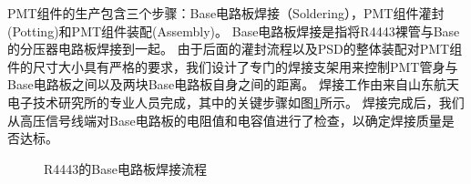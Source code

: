 PMT组件的生产包含三个步骤：Base电路板焊接（Soldering），PMT组件灌封(Potting)和PMT组件装配(Assembly)。
Base电路板焊接是指将R4443裸管与Base的分压器电路板焊接到一起。
由于后面的灌封流程以及PSD的整体装配对PMT组件的尺寸大小具有严格的要求，我们设计了专门的焊接支架用来控制PMT管身与Base电路板之间以及两块Base电路板自身之间的距离。
焊接工作由来自山东航天电子技术研究所的专业人员完成，其中的关键步骤如图\ref{fig:construction:soldering}所示。
焊接完成后，我们从高压信号线端对Base电路板的电阻值和电容值进行了检查，以确定焊接质量是否达标。
\begin{figure}[htb]
\centering
{}
{}
\caption{R4443的Base电路板焊接流程}
\label{fig:construction:soldering}
\end{figure}
